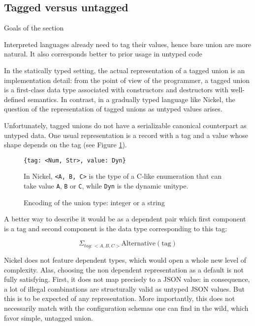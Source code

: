\subsection{Tagged versus untagged}
{\color{red}Goals of the section

Interpreted languages already need to tag their values, hence bare union are more natural.
It also corresponds better to prior usage in untyped code\vspace{0.5cm}}

In the statically typed setting, the actual representation of a tagged union is
an implementation detail: from the point of view of the programmer, a tagged
union is a first-class data type associated with constructors and destructors
with well-defined semantics. In contrast, in a gradually typed language like
Nickel, the question of the representation of tagged unions as untyped values
arises.

Unfortunately, tagged unions do not have a serializable canonical counterpart as
untyped data. One usual representation is a record with a tag and a value whose
shape depends on the tag (see Figure \ref{fig:union-encoding}).

\begin{figure}
  \begin{center}
\begin{lstlisting}[language=nickel]
{tag: <Num, Str>, value: Dyn}
\end{lstlisting}
  \end{center}
\caption{Encoding of the union type: integer or a string}
\label{fig:union-encoding}
\medskip
\small
In Nickel, \lstinline+<A, B, C>+ is the type of a C-like enumeration that can
take value \lstinline+A+, \lstinline+B+ or \lstinline+C+, while \lstinline+Dyn+
is the dynamic unitype.
\end{figure}

A better way to describe it would be as a dependent pair which first component
is a tag and second component is the data type corresponding to this tag:

\[
    \Sigma_{tag : <A, B, C>} \text{Alternative}(\text{tag})
\]

Nickel does not feature dependent types, which would open a whole new level of
complexity. Alas, choosing the non dependent representation as a default is not
fully satisfying.  First, it does not map precisely to a JSON value: in
consequence, a lot of illegal combinations are structurally valid as untyped
JSON values. But this is to be expected of any representation. More importantly,
this does not necessarily match with the configuration schemas one can find in
the wild, which favor simple, untagged union.

